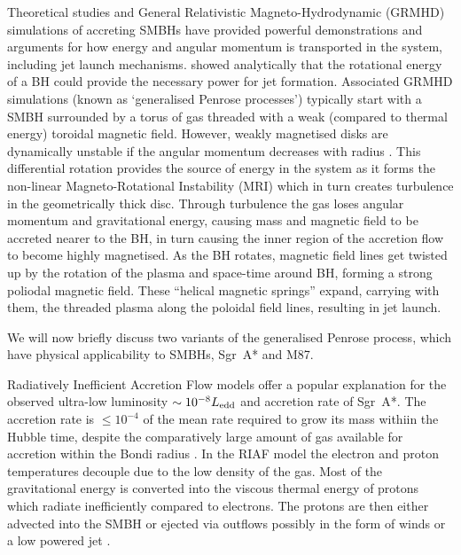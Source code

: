 Theoretical studies and General Relativistic {Magneto-Hydrodynamic (GRMHD)} simulations of accreting SMBHs \citep[e.g.][]{Gammie_2003,Narayan_2012,Moscibrodzka_2013} have provided powerful demonstrations and arguments for how energy and angular momentum is transported in the system, including jet launch mechanisms. \citet{Penrose_1969} showed analytically that the rotational energy of a BH could provide the necessary power for jet formation. Associated GRMHD simulations (known as `generalised Penrose processes') typically start with a SMBH surrounded by a torus of gas threaded with a weak (compared to thermal energy) toroidal magnetic field. However, weakly magnetised disks are dynamically unstable if the angular momentum decreases with radius \citep{Balbus_1998}. This differential rotation provides the source of energy in the system as it forms the non-linear Magneto-Rotational Instability (MRI) which in turn creates turbulence in the geometrically thick disc. Through turbulence the gas loses angular momentum and gravitational energy, causing mass and magnetic field to be accreted nearer to the BH, in turn causing the inner region of the accretion flow to become highly magnetised. As the BH rotates, magnetic field lines get twisted up by the rotation of the plasma and space-time around BH, forming a strong poliodal magnetic  field. These ``helical magnetic springs'' \citep{Narayan_2014} expand, carrying with them, the threaded plasma along the poloidal field lines, resulting in jet launch.  



We will now briefly discuss two variants of the generalised Penrose process, which have physical applicability to SMBHs, Sgr~A* and M87.
 
Radiatively Inefficient Accretion Flow \citep[(RIAF),][]{Narayan_1995,Yuan_2003} models offer a popular explanation for the observed ultra-low luminosity $\sim 10^{-8} L_{\rm edd}$ and accretion rate of Sgr~A*. The accretion rate is $\le 10^{-4}$ of the mean rate required to grow its mass withiin the Hubble time, despite the comparatively large amount of gas available for accretion within the Bondi radius \citep{Goddi_2016}. In the RIAF model the electron and proton temperatures decouple due to the low density of the gas. Most of the gravitational energy is converted into the viscous thermal energy of protons which radiate inefficiently compared to electrons. The protons are then either advected into the SMBH \citep{Narayan_1998} or ejected via outflows possibly in the form of winds or a low powered jet \citep{Blandford_1999}. 


